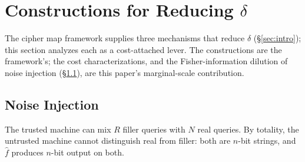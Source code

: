 \documentclass[11pt]{article}
\theoremstyle{definition}
\theoremstyle{plain}
\theoremstyle{remark}
\newcommand{\fhat}{\hat{f}}
\begin{document}
\section{Constructions for Reducing \texorpdfstring{$\delta$}{delta}}
\label{sec:levers}

The cipher map framework supplies three mechanisms that reduce
$\delta$ (\S\ref{sec:intro}); this section analyzes each as a
cost-attached lever.  The constructions are the framework's; the cost
characterizations, and the Fisher-information dilution of noise
injection (\S\ref{subsec:noise}), are this paper's marginal-scale
contribution.

\subsection{Noise Injection}
\label{subsec:noise}

The trusted machine can mix $R$ filler queries with $N$ real queries.  By
totality, the untrusted machine cannot distinguish real from filler: both
are $n$-bit strings, and $\fhat$ produces $n$-bit output on both.
\end{document}
